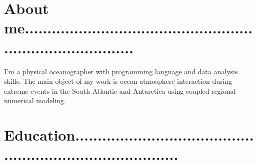 \documentclass[letterpaper]{twentysecondcv} %
\begin{document}

\makeprofile %

\section{About me\textcolor{maingray}{................................................................................}}

I'm a physical oceanographer with programming language and data analysis skills. The main object of my work is ocean-atmosphere interaction during extreme events in the South Atlantic and Antarctica using coupled regional numerical modeling.
\\

\section{Education\textcolor{mainblue}{...............................................................................}}
\end{document}

